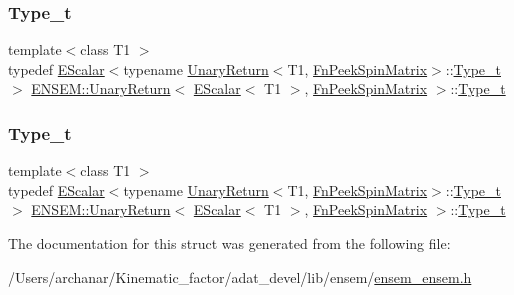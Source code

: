 \subsubsection{\texorpdfstring{Type\_t}{Type\_t}\hspace{0.1cm}{\footnotesize\ttfamily [1/2]}}
{\footnotesize\ttfamily template$<$class T1 $>$ \\
typedef \mbox{\hyperlink{classENSEM_1_1EScalar}{E\+Scalar}}$<$typename \mbox{\hyperlink{structENSEM_1_1UnaryReturn}{Unary\+Return}}$<$T1, \mbox{\hyperlink{structENSEM_1_1FnPeekSpinMatrix}{Fn\+Peek\+Spin\+Matrix}}$>$\+::\mbox{\hyperlink{structENSEM_1_1UnaryReturn_3_01EScalar_3_01T1_01_4_00_01FnPeekSpinMatrix_01_4_a957ed63ce5bc6fafff58fcb1c1122635}{Type\+\_\+t}}$>$ \mbox{\hyperlink{structENSEM_1_1UnaryReturn}{E\+N\+S\+E\+M\+::\+Unary\+Return}}$<$ \mbox{\hyperlink{classENSEM_1_1EScalar}{E\+Scalar}}$<$ T1 $>$, \mbox{\hyperlink{structENSEM_1_1FnPeekSpinMatrix}{Fn\+Peek\+Spin\+Matrix}} $>$\+::\mbox{\hyperlink{structENSEM_1_1UnaryReturn_3_01EScalar_3_01T1_01_4_00_01FnPeekSpinMatrix_01_4_a957ed63ce5bc6fafff58fcb1c1122635}{Type\+\_\+t}}}

\mbox{\label{structENSEM_1_1UnaryReturn_3_01EScalar_3_01T1_01_4_00_01FnPeekSpinMatrix_01_4_a957ed63ce5bc6fafff58fcb1c1122635}} 
\subsubsection{\texorpdfstring{Type\_t}{Type\_t}\hspace{0.1cm}{\footnotesize\ttfamily [2/2]}}
{\footnotesize\ttfamily template$<$class T1 $>$ \\
typedef \mbox{\hyperlink{classENSEM_1_1EScalar}{E\+Scalar}}$<$typename \mbox{\hyperlink{structENSEM_1_1UnaryReturn}{Unary\+Return}}$<$T1, \mbox{\hyperlink{structENSEM_1_1FnPeekSpinMatrix}{Fn\+Peek\+Spin\+Matrix}}$>$\+::\mbox{\hyperlink{structENSEM_1_1UnaryReturn_3_01EScalar_3_01T1_01_4_00_01FnPeekSpinMatrix_01_4_a957ed63ce5bc6fafff58fcb1c1122635}{Type\+\_\+t}}$>$ \mbox{\hyperlink{structENSEM_1_1UnaryReturn}{E\+N\+S\+E\+M\+::\+Unary\+Return}}$<$ \mbox{\hyperlink{classENSEM_1_1EScalar}{E\+Scalar}}$<$ T1 $>$, \mbox{\hyperlink{structENSEM_1_1FnPeekSpinMatrix}{Fn\+Peek\+Spin\+Matrix}} $>$\+::\mbox{\hyperlink{structENSEM_1_1UnaryReturn_3_01EScalar_3_01T1_01_4_00_01FnPeekSpinMatrix_01_4_a957ed63ce5bc6fafff58fcb1c1122635}{Type\+\_\+t}}}



The documentation for this struct was generated from the following file\+:\begin{DoxyCompactItemize}
\item 
/\+Users/archanar/\+Kinematic\+\_\+factor/adat\+\_\+devel/lib/ensem/\mbox{\hyperlink{lib_2ensem_2ensem__ensem_8h}{ensem\+\_\+ensem.\+h}}\end{DoxyCompactItemize}
